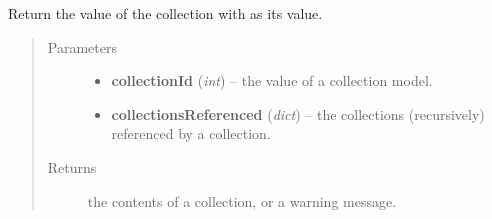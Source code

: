 \documentclass[letterpaper,10pt,english]{sphinxmanual}
\begin{document}

\begin{fulllineitems}
\label{api:onlinelinguisticdatabase.controllers.oldcollections.getContents}
Return the  value of the collection with  as its  value.
\begin{quote}\begin{description}
\item[{Parameters}] \leavevmode\begin{itemize}
\item {} 
\textbf{collectionId} (\emph{int}) -- the  value of a collection model.

\item {} 
\textbf{collectionsReferenced} (\emph{dict}) -- the collections (recursively) referenced by a collection.

\end{itemize}

\item[{Returns}] \leavevmode
the contents of a collection, or a warning message.

\end{description}\end{quote}

\end{fulllineitems}

\end{document}
